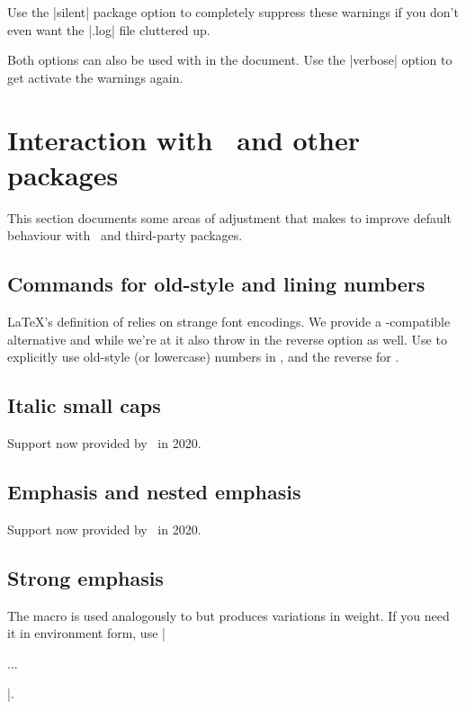 \documentclass[a4paper]{l3doc}
\begin{document}
Use the |silent| package option to completely suppress these warnings if you
don't even want the |.log| file cluttered up.

Both options can also be used with  in the document. Use the |verbose| option to get activate the warnings again.

\section{Interaction with \LaTeXe\ and other packages}

This section documents some areas of adjustment that  makes
to improve default behaviour with \LaTeXe\ and third-party packages.



\subsection{Commands for old-style and lining numbers}

\DescribeMacro{\oldstylenums}
\DescribeMacro{\liningnums}
\LaTeX's definition of  relies on strange font encodings.
We provide a -compatible alternative and while we're at it
also throw in the reverse option as well. Use 
to explicitly use old-style (or lowercase) numbers in , and
the reverse for .


\subsection{Italic small caps}

Support now provided by \LaTeXe\ in 2020.


\subsection{Emphasis and nested emphasis}

Support now provided by \LaTeXe\ in 2020.


\subsection{Strong emphasis}

\DescribeMacro{\strong}
\DescribeMacro{\strongenv}
The  macro is used analogously to  but produces variations in weight.
If you need it in environment form, use |\begin{strongenv}...\end{strongenv}|.
\end{document}
